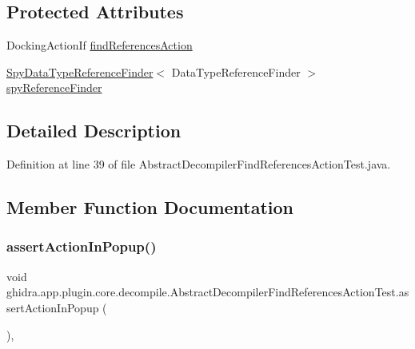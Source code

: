 \subsection*{Protected Attributes}
\begin{DoxyCompactItemize}
\item 
Docking\+Action\+If \mbox{\hyperlink{classghidra_1_1app_1_1plugin_1_1core_1_1decompile_1_1_abstract_decompiler_find_references_action_test_abd101d9164795cceef897f26ba6c0c1f}{find\+References\+Action}}
\item 
\mbox{\hyperlink{classghidra_1_1app_1_1plugin_1_1core_1_1decompile_1_1_abstract_decompiler_find_references_action62f1da74789936d35e783df474af1e76}{Spy\+Data\+Type\+Reference\+Finder}}$<$ Data\+Type\+Reference\+Finder $>$ \mbox{\hyperlink{classghidra_1_1app_1_1plugin_1_1core_1_1decompile_1_1_abstract_decompiler_find_references_action_test_a7fff498f5aae4fdd9104442ddc904ce5}{spy\+Reference\+Finder}}
\end{DoxyCompactItemize}


\subsection{Detailed Description}


Definition at line 39 of file Abstract\+Decompiler\+Find\+References\+Action\+Test.\+java.



\subsection{Member Function Documentation}
\mbox{\label{classghidra_1_1app_1_1plugin_1_1core_1_1decompile_1_1_abstract_decompiler_find_references_action_test_ad05621fc0e04e0d55f9aafae24f78f6f}} 
\subsubsection{\texorpdfstring{assertActionInPopup()}{assertActionInPopup()}}
{\footnotesize\ttfamily void ghidra.\+app.\+plugin.\+core.\+decompile.\+Abstract\+Decompiler\+Find\+References\+Action\+Test.\+assert\+Action\+In\+Popup (\begin{DoxyParamCaption}{ }\end{DoxyParamCaption})\hspace{0.3cm}{\ttfamily [inline]}, {\ttfamily [protected]}}



